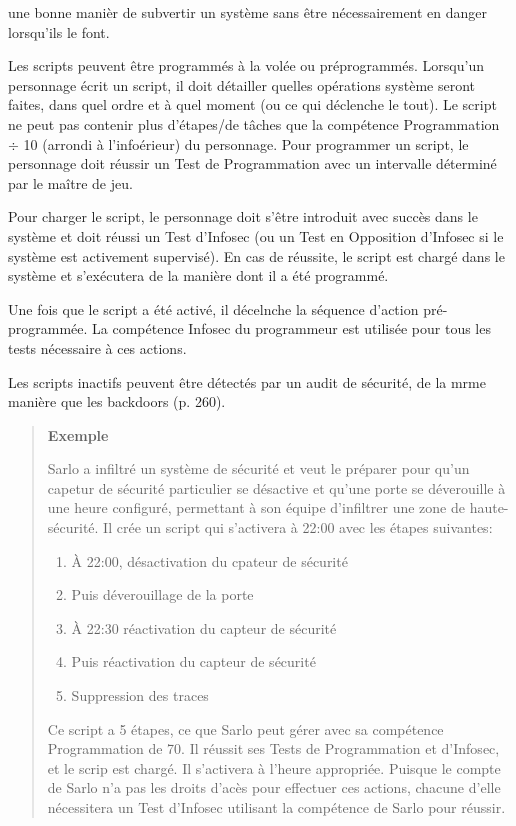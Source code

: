 une bonne manièr de subvertir un système sans être nécessairement en danger lorsqu'ils le font. 

Les scripts peuvent être programmés à la volée ou préprogrammés. Lorsqu'un personnage écrit un script, il doit détailler quelles opérations système seront faites, dans quel ordre et à quel moment (ou ce qui déclenche le tout). Le script ne peut pas contenir plus d'étapes/de tâches que la compétence Programmation $\div$ 10 (arrondi à l'infoérieur) du personnage. Pour programmer un script, le personnage doit réussir un Test de Programmation avec un intervalle déterminé par le maître de jeu. 

Pour charger le script, le personnage doit s'être introduit avec succès dans le système et doit réussi un Test d'Infosec (ou un Test en Opposition d'Infosec si le système est activement supervisé). En cas de réussite, le script est chargé dans le système et s'exécutera de la manière dont il a été programmé. 

Une fois que le script a été activé, il décelnche la séquence d'action pré-programmée. La compétence Infosec du programmeur est utilisée pour tous les tests nécessaire à ces actions. 

Les scripts inactifs peuvent être détectés par un audit de sécurité, de la mrme manière que les backdoors (p. 260). 

\begin{quotation} \textbf{Exemple} 

Sarlo a infiltré un système de sécurité et veut le préparer pour qu'un capetur de sécurité particulier se désactive et qu'une porte se déverouille à une heure configuré, permettant à son équipe d'infiltrer une zone de haute-sécurité. Il crée un script qui s'activera à 22:00 avec les étapes suivantes: \begin{enumerate} \item À 22:00, désactivation du cpateur de sécurité \item Puis déverouillage de la porte \item À 22:30 réactivation du capteur de sécurité \item Puis réactivation du capteur de sécurité \item Suppression des traces \end{enumerate} 

Ce script a 5 étapes, ce que Sarlo peut gérer avec sa compétence Programmation de 70. Il réussit ses Tests de Programmation et d'Infosec, et le scrip est chargé. Il s'activera à l'heure appropriée. Puisque le compte de Sarlo n'a pas les droits d'acès pour effectuer ces actions, chacune d'elle nécessitera un Test d'Infosec utilisant la compétence de Sarlo pour réussir. 

\end{quotation} 



